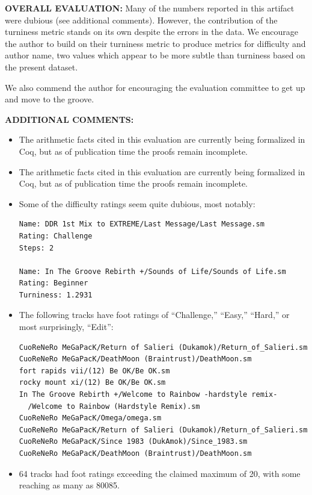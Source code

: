 \documentclass[12pt]{article}
\begin{document}
\textbf{OVERALL EVALUATION:}
 Many of the numbers reported in this artifact were dubious (see
 additional comments). However, the contribution of the turniness metric stands on its own despite
 the errors in the data. We encourage the author to build on their turniness metric to produce metrics
 for difficulty and author name, two values which appear to be more subtle than turniness based on
 the present dataset.

 We also commend the author for encouraging the evaluation committee to get up and move to the
 groove.

\textbf{ADDITIONAL COMMENTS:}
\begin{itemize}
\item The arithmetic facts cited in this evaluation are currently being formalized in Coq, but as of
publication time the proofs remain incomplete.

\item The arithmetic facts cited in this evaluation are currently being formalized in Coq, but as of
publication time the proofs remain incomplete.

\item Some of the difficulty ratings seem quite dubious, most notably:

\begin{verbatim}
Name: DDR 1st Mix to EXTREME/Last Message/Last Message.sm
Rating: Challenge
Steps: 2

Name: In The Groove Rebirth +/Sounds of Life/Sounds of Life.sm
Rating: Beginner
Turniness: 1.2931
\end{verbatim}

\item The following tracks have foot ratings of ``Challenge,'' ``Easy,'' ``Hard,'' or most surprisingly,
``Edit'':

\begin{verbatim}
CuoReNeRo MeGaPacK/Return of Salieri (Dukamok)/Return_of_Salieri.sm
CuoReNeRo MeGaPacK/DeathMoon (Braintrust)/DeathMoon.sm
fort rapids vii/(12) Be OK/Be OK.sm
rocky mount xi/(12) Be OK/Be OK.sm
In The Groove Rebirth +/Welcome to Rainbow -hardstyle remix-
  /Welcome to Rainbow (Hardstyle Remix).sm
CuoReNeRo MeGaPacK/Omega/omega.sm
CuoReNeRo MeGaPacK/Return of Salieri (Dukamok)/Return_of_Salieri.sm
CuoReNeRo MeGaPacK/Since 1983 (DukAmok)/Since_1983.sm
CuoReNeRo MeGaPacK/DeathMoon (Braintrust)/DeathMoon.sm
\end{verbatim}

\item 64 tracks had foot ratings exceeding the claimed maximum of 20, with some reaching as
many as 80085.


\end{itemize}
\end{document}
